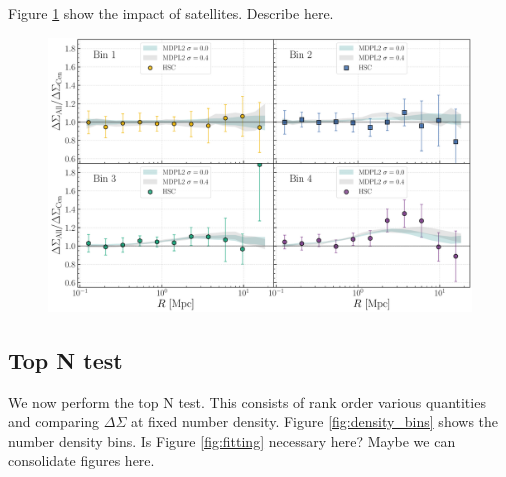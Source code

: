 \documentclass[a4paper,fleqn,usenatbib]{mnras}
\begin{document}
Figure \ref{fig:satellite} show the impact of satellites. Describe here.


  \begin{figure}
      \centering 
      \includegraphics[width=\textwidth]{fig/small/dsigma_sat_ratio}
      \caption{
          }
      \label{fig:satellite}
  \end{figure}

\subsection{Top N test}

We now perform the top N test. This consists of rank order various quantities and comparing $\Delta\Sigma$ at fixed number density. Figure \ref{fig:density_bins} shows the number density bins. Is Figure \ref{fig:fitting} necessary here? Maybe we can consolidate figures here.
\end{document}
